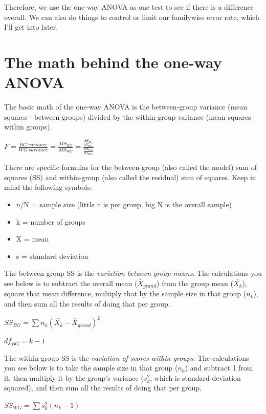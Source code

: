 \documentclass[
]{book}
\providecommand{\tightlist}{%
  \setlength{\itemsep}{0pt}\setlength{\parskip}{0pt}}
\begin{document}
Therefore, we use the one-way ANOVA as one test to see if there is a difference overall. We can also do things to control or limit our familywise error rate, which I'll get into later.

\hypertarget{the-math-behind-the-one-way-anova}{%
\section{The math behind the one-way ANOVA}\label{the-math-behind-the-one-way-anova}}

The basic math of the one-way ANOVA is the between-group variance (mean squares - between groups) divided by the within-group variance (mean squares - within groups).

\(F = \frac{BG \:variance}{WG \:variance} = \frac{MS_{BG}}{MS_{WG}} = \frac{\frac{SS_{BG}}{df_{BG}}}{\frac{SS_{WG}}{df_{WG}}}\)

There are specific formulas for the between-group (also called the model) sum of squares (SS) and within-group (also called the residual) sum of squares. Keep in mind the following symbols:

\begin{itemize}
\tightlist
\item
  n/N = sample size (little n is per group, big N is the overall sample)
\item
  k = number of groups
\item
  X = mean
\item
  s = standard deviation
\end{itemize}

The between-group SS is the \emph{variation between group means}. The calculations you see below is to subtract the overall mean (\(\bar{X}_{grand}\)) from the group mean (\(\bar{X_k}\)), square that mean difference, multiply that by the sample size in that group (\(n_k\)), and then sum all the results of doing that per group.

\(SS_{BG} = \sum{n_k}(\bar{X_k}-\bar{X}_{grand})^2\)

\(df_{BG} = k - 1\)

The within-group SS is the \emph{variation of scores within groups}. The calculations you see below is to take the sample size in that group (\(n_k\)) and subtract 1 from it, then multiply it by the group's variance (\(s_k^2\), which is standard deviation squared), and then sum all the results of doing that per group.

\(SS_{WG} = \sum{s_k^2}(n_k - 1)\)
\end{document}

